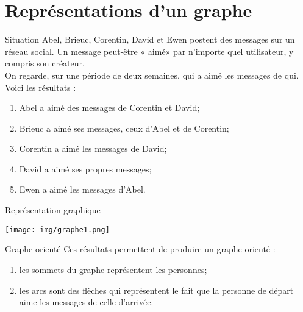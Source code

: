 \documentclass[10pt]{beamer}
\begin{document}
\section{Représentations d'un graphe}
\begin{frame}{Situation}
Abel, Brieuc, Corentin, David et Ewen postent des messages sur un réseau social. Un message peut-être « aimé» par n'importe quel utilisateur, y compris son créateur.\\ \pause
On regarde, sur une période de deux semaines, qui a aimé les messages de qui. Voici les résultats : \pause

\begin{enumerate}[--]
	\item 	Abel a aimé des messages de Corentin  et David;\pause
	\item 	Brieuc a aimé ses messages, ceux d'Abel et de Corentin;\pause
	\item 	Corentin a aimé les messages de David;\pause
	\item 	David a aimé ses propres messages;\pause
	\item 	Ewen a aimé les messages d'Abel.
\end{enumerate}
\end{frame}

\begin{frame}{Représentation graphique}
\begin{center}
\texttt{[image: img/graphe1.png]}
\end{center}
\end{frame}

\begin{frame}{Graphe orienté}
Ces résultats permettent de produire un \alert{graphe orienté} :\pause
\begin{enumerate}[--]
	\item 	les \alert{sommets du graphe} représentent les personnes;\pause
	\item 	les \alert{arcs} sont des flèches qui représentent le fait que la personne de départ aime les messages de celle d'arrivée.
\end{enumerate}
\end{frame}
\end{document}
